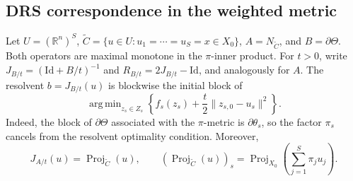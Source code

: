 \documentclass[preprint,12pt,3p]{elsarticle}
\theoremstyle{definition}
\DeclareMathOperator*{\argmin}{arg\,min}
\begin{document}
\subsection{DRS correspondence in the weighted metric}
Let $U=(\mathbb R^n)^S$, $\widetilde C=\{u\in U:u_1=\cdots=u_S=x\in X_0\}$, $A=N_{\widetilde C}$, and $B=\partial\Theta$. Both operators are maximal monotone in the $\pi$-inner product. For $t>0$, write $J_{B/t}=(\mathrm{Id}+B/t)^{-1}$ and $R_{B/t}=2J_{B/t}-\mathrm{Id}$, and analogously for $A$. The resolvent $b=J_{B/t}(u)$ is blockwise the initial block of
\begin{equation}
\argmin_{z_s\in Z_s}\left\{f_s(z_s)+\frac{t}{2}\|z_{s,0}-u_s\|^2\right\}.
\label{eq:resolvent}
\end{equation}
Indeed, the block of $\partial\Theta$ associated with the $\pi$-metric is $\partial\theta_s$, so the factor $\pi_s$ cancels from the resolvent optimality condition. Moreover,
\begin{equation}
J_{A/t}(u)=\operatorname{Proj}_{\widetilde C}(u),\qquad
(\operatorname{Proj}_{\widetilde C}(u))_s=\operatorname{Proj}_{X_0}\left(\sum_{j=1}^S\pi_j u_j\right).
\label{eq:consensusproj}
\end{equation}
\end{document}
